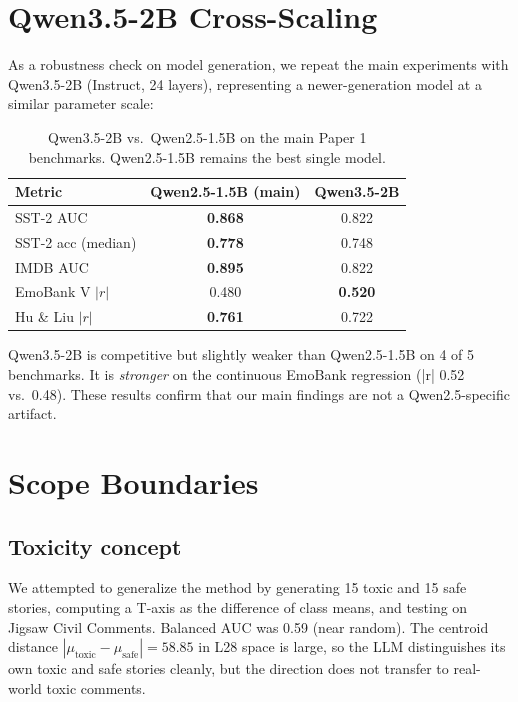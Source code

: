 \section{Qwen3.5-2B Cross-Scaling}
\label{sup:qwen35}

As a robustness check on model generation, we repeat the main
experiments with Qwen3.5-2B (Instruct, 24 layers), representing a
newer-generation model at a similar parameter scale:

\begin{table}[h]
\centering
\caption{Qwen3.5-2B vs.\ Qwen2.5-1.5B on the main Paper 1 benchmarks.
Qwen2.5-1.5B remains the best single model.}
\label{tab:sup_qwen35}
\begin{tabular}{lcc}
\toprule
Metric & Qwen2.5-1.5B (main) & Qwen3.5-2B \\
\midrule
SST-2 AUC           & \textbf{0.868} & 0.822 \\
SST-2 acc (median)  & \textbf{0.778} & 0.748 \\
IMDB AUC            & \textbf{0.895} & 0.822 \\
EmoBank V $|r|$     & 0.480          & \textbf{0.520} \\
Hu \& Liu $|r|$     & \textbf{0.761} & 0.722 \\
\bottomrule
\end{tabular}
\end{table}

Qwen3.5-2B is competitive but slightly weaker than Qwen2.5-1.5B on 4 of
5 benchmarks. It is \emph{stronger} on the continuous EmoBank regression
(|r| 0.52 vs.\ 0.48). These results confirm that our main findings are
not a Qwen2.5-specific artifact.

\section{Scope Boundaries}
\label{sup:scope_boundaries}

\subsection{Toxicity concept}
We attempted to generalize the method by generating 15 toxic and 15 safe
stories, computing a T-axis as the difference of class means, and testing on
Jigsaw Civil Comments. Balanced AUC was 0.59 (near random). The centroid
distance $|\mu_{\mathrm{toxic}} - \mu_{\mathrm{safe}}| = 58.85$ in L28 space
is large, so the LLM distinguishes its own toxic and safe stories cleanly,
but the direction does not transfer to real-world toxic comments.

